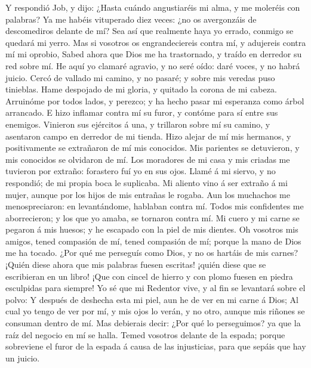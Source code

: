  Y respondió Job, y dijo:  ¿Hasta cuándo
angustiaréis mi alma, y me moleréis con palabras?  Ya me
habéis vituperado diez veces: ¿no os avergonzáis de descomediros delante
de mí?  Sea así que realmente haya yo errado, conmigo se
quedará mi yerro.  Mas si vosotros os engrandeciereis
contra mí, y adujereis contra mí mi oprobio,  Sabed ahora
que Dios me ha trastornado, y traído en derredor su red sobre mí.
 He aquí yo clamaré agravio, y no seré oído: daré voces, y
no habrá juicio.  Cercó de vallado mi camino, y no pasaré;
y sobre mis veredas puso tinieblas.  Hame despojado de mi
gloria, y quitado la corona de mi cabeza.  Arruinóme por
todos lados, y perezco; y ha hecho pasar mi esperanza como árbol
arrancado.  E hizo inflamar contra mí su furor, y contóme
para sí entre sus enemigos.  Vinieron sus ejércitos á
una, y trillaron sobre mí su camino, y asentaron campo en derredor de mi
tienda.  Hizo alejar de mí mis hermanos, y positivamente
se extrañaron de mí mis conocidos.  Mis parientes se
detuvieron, y mis conocidos se olvidaron de mí.  Los
moradores de mi casa y mis criadas me tuvieron por extraño: forastero
fuí yo en sus ojos.  Llamé á mi siervo, y no respondió;
de mi propia boca le suplicaba.  Mi aliento vino á ser
extraño á mi mujer, aunque por los hijos de mis entrañas le rogaba.
 Aun los muchachos me menospreciaron: en levantándome,
hablaban contra mí.  Todos mis confidentes me
aborrecieron; y los que yo amaba, se tornaron contra mí. 
Mi cuero y mi carne se pegaron á mis huesos; y he escapado con la piel
de mis dientes.  Oh vosotros mis amigos, tened compasión
de mí, tened compasión de mí; porque la mano de Dios me ha tocado.
 ¿Por qué me perseguís como Dios, y no os hartáis de mis
carnes?  ¡Quién diese ahora que mis palabras fuesen
escritas! ¡quién diese que se escribieran en un libro! 
¡Que con cincel de hierro y con plomo fuesen en piedra esculpidas para
siempre!  Yo sé que mi Redentor vive, y al fin se
levantará sobre el polvo:  Y después de deshecha esta mi
piel, aun he de ver en mi carne á Dios;  Al cual yo tengo
de ver por mí, y mis ojos lo verán, y no otro, aunque mis riñones se
consuman dentro de mí.  Mas debierais decir: ¿Por qué lo
perseguimos? ya que la raíz del negocio en mí se halla. 
Temed vosotros delante de la espada; porque sobreviene el furor de la
espada á causa de las injusticias, para que sepáis que hay un juicio.

